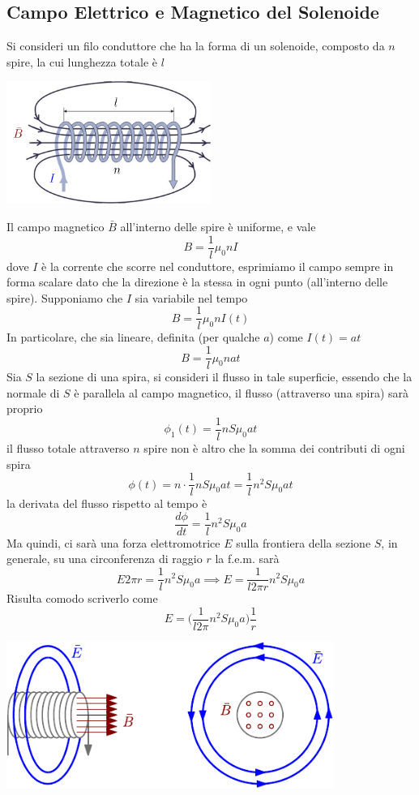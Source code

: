 \documentclass[10pt, letterpaper]{report}
\begin{document}
\subsection{Campo Elettrico e Magnetico del Solenoide}
Si consideri un filo conduttore che ha la forma di un solenoide, composto da $n$ spire, la cui lunghezza totale è $l$
\begin{center}
    \includegraphics[width=0.5\textwidth ]{images/solenoide.png}
\end{center}
Il campo magnetico $\bar B$ all'interno delle spire è uniforme, e vale $$ B=\frac{1}{l}\mu_0n I$$
dove $I$ è la corrente che scorre nel conduttore, esprimiamo il campo sempre in forma scalare dato che la direzione è la stessa in ogni punto (all'interno delle spire). Supponiamo che $I$ sia variabile nel tempo 
$$ B=\frac{1}{l}\mu_0n I(t)$$
In particolare, che sia lineare, definita (per qualche $a$) come $I(t)=at$
$$ B=\frac{1}{l}\mu_0n at$$
Sia $S$ la sezione di una spira, si consideri il flusso in tale superficie, essendo che la normale di $S$ è parallela al campo magnetico, il flusso (attraverso una spira) sarà proprio 
$$ \phi_1(t)=\frac{1}{l}nS\mu_0at$$
il flusso  totale attraverso $n$ spire non è altro che la somma dei contributi di ogni spira 
$$ \phi(t)=n\cdot \frac{1}{l}nS\mu_0at= \frac{1}{l}n^2S\mu_0at$$
la derivata del flusso rispetto al tempo è 
$$ 
\dfrac{d\phi}{dt}=\frac{1}{l}n^2S\mu_0a$$
Ma quindi, ci sarà una forza elettromotrice $E$ sulla frontiera della sezione $S$, in generale, su una circonferenza di raggio $r$ la f.e.m. sarà 
$$ E2\pi r=\frac{1}{l}n^2S\mu_0a\implies E =\frac{1}{l2\pi r}n^2S\mu_0a $$
Risulta comodo scriverlo come 
$$ E=\Big(\frac{1}{l2\pi }n^2S\mu_0a\Big)\frac{1}{r}$$
\begin{center}
    \includegraphics[width=0.8\textwidth ]{images/solenoide.pdf}
\end{center}
\end{document}
